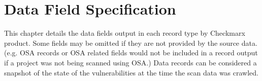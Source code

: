\chapter{Data Field Specification}\label{chap:spec}

This chapter details the data fields output in each record type by Checkmarx product. Some fields may be omitted if they are not provided
by the source data.  (e.g. OSA records or OSA related fields would not be included in a record output if a project was not being scanned
using OSA.)  Data records can be considered a snapshot of the state of the vulnerabilities at the time the scan data was crawled.





